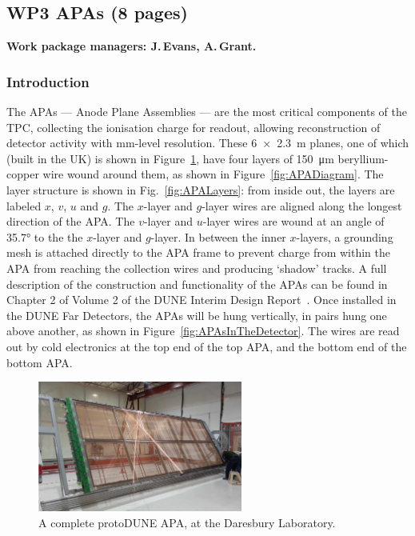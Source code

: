 \subsection{WP3 APAs (8 pages)}

{\bf Work package managers: J.\,Evans, A.\,Grant.}

\subsubsection{Introduction}

The APAs --- Anode Plane Assemblies --- are the most critical components of the TPC, collecting the ionisation charge for readout, allowing reconstruction of detector activity with mm-level resolution. These \SI{6x 2.3}{\metre} planes, one of which (built in the UK) is shown in Figure~\ref{fig:CompleteAPA}, have four layers of \SI{150}{\micro\metre} beryllium-copper wire wound around them, as shown in Figure~\ref{fig:APADiagram}. The layer structure is shown in Fig.~\ref{fig:APALayers}: from inside out, the layers are labeled $x$, $v$, $u$ and $g$. The $x$-layer and $g$-layer wires are aligned along the longest direction of the APA. The $v$-layer and $u$-layer wires are wound at an angle of \ang{35.7} to the the $x$-layer and $g$-layer. In between the inner $x$-layers, a grounding mesh is attached directly to the APA frame to prevent charge from within the APA from reaching the collection wires and producing `shadow' tracks. A full description of the construction and functionality of the APAs can be found in Chapter 2 of Volume 2 of the DUNE Interim Design Report~\cite{ref:DUNEIDR}. Once installed in the DUNE Far Detectors, the APAs will be hung vertically, in pairs hung one above another, as shown in Figure~\ref{fig:APAsInTheDetector}. The wires are read out by cold electronics at the top end of the top APA, and the bottom end of the bottom APA.

\begin{figure}
    \centering
    \includegraphics[width=0.6\textwidth]{figs/WP3/UKAPA.png}
    \caption{A complete protoDUNE APA, at the Daresbury Laboratory.}
    \label{fig:CompleteAPA}
\end{figure}

